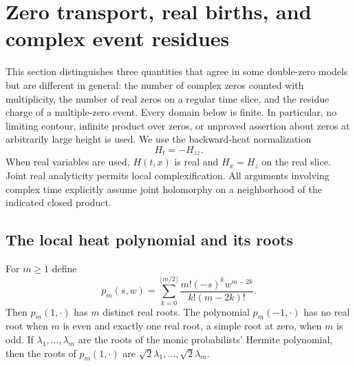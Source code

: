 \section{Zero transport, real births, and complex event residues}
\label{tr:section}

This section distinguishes three quantities that agree in some double-zero
models but are different in general: the number of complex zeros counted
with multiplicity, the number of real zeros on a regular time slice, and
the residue charge of a multiple-zero event.  Every domain below is finite.
In particular, no limiting contour, infinite product over zeros, or
unproved assertion about zeros at arbitrarily large height is used.
We use the backward-heat normalization
\begin{equation}\label{tr:heat}
                    H_t=-H_{zz}.
\end{equation}
When real variables are used, $H(t,x)$ is real and $H_x=H_z$ on the real
slice.  Joint real analyticity permits local complexification.  All
arguments involving complex time explicitly assume joint holomorphy on
a neighborhood of the indicated closed product.

\subsection{The local heat polynomial and its roots}

\begin{lemma}\label{tr:hermite-roots}
For $m\geq1$ define
\[
 p_m(s,w)=\sum_{k=0}^{\lfloor m/2\rfloor}
        \frac{m!(-s)^k w^{m-2k}}{k!(m-2k)!}.
\]
Then $p_m(1,\cdot)$ has $m$ distinct real roots.  The polynomial
$p_m(-1,\cdot)$ has no real root when $m$ is even and exactly one real
root, a simple root at zero, when $m$ is odd.  If
$\lambda_1,\ldots,\lambda_m$ are the roots of the monic probabilists'
Hermite polynomial, then the roots of $p_m(1,\cdot)$ are
$\sqrt2\lambda_1,\ldots,\sqrt2\lambda_m$.
\end{lemma}

